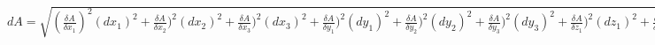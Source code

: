 \documentclass{standalone}
\begin{document}
    $dA = \sqrt{ (\frac{\delta A}{\delta x_1})^2 (d{x_1})^2 + \frac{\delta A}{\delta x_2})^2 (d{x_2})^2 + \frac{\delta A}{\delta x_3})^2 (d{x_3})^2 + \frac{\delta A}{\delta y_1})^2 (d{y_1})^2 + \frac{\delta A}{\delta y_2})^2 (d{y_2})^2 + \frac{\delta A}{\delta y_3})^2 (d{y_3})^2 + \frac{\delta A}{\delta z_1})^2 (d{z_1})^2 + \frac{\delta A}{\delta z_2})^2 (d{z_2})^2 + \frac{\delta A}{\delta z_3})^2 (d{z_3})^2}$
\end{document}
